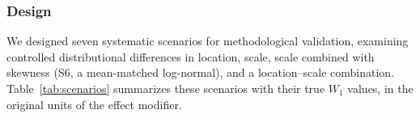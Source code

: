 \documentclass[AMA,Times1COL]{WileyNJDv5}
\begin{document}
\subsubsection{Design}\label{sec:sim_design}

We designed seven systematic scenarios for methodological validation, examining controlled distributional differences in location, scale, scale combined with skewness (S6, a mean-matched log-normal), and a location--scale combination. Table~\ref{tab:scenarios} summarizes these scenarios with their true $W_1$ values, in the original units of the effect modifier.
\end{document}
